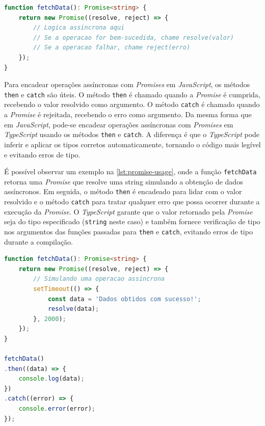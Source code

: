 \begin{lstlisting}[language=TypeScript, caption={Criação de uma \textit{Promise} em \textit{TypeScript}}, label=lst:promise-ts]
function fetchData(): Promise<string> {
    return new Promise((resolve, reject) => {
        // Logica assincrona aqui
        // Se a operacao for bem-sucedida, chame resolve(valor)
        // Se a operacao falhar, chame reject(erro)
    });
}
\end{lstlisting}


Para encadear operações assíncronas com \textit{Promises} em \textit{JavaScript}, os métodos \texttt{then} e \texttt{catch} são úteis. O método \texttt{then} é chamado quando a \textit{Promise} é cumprida, recebendo o valor resolvido como argumento. O método \texttt{catch} é chamado quando a \textit{Promise} é rejeitada, recebendo o erro como argumento. Da mesma forma que em \textit{JavaScript}, pode-se encadear operações assíncronas com \textit{Promises} em \textit{TypeScript} usando os métodos \texttt{then} e \texttt{catch}. A diferença é que o \textit{TypeScript} pode inferir e aplicar os tipos corretos automaticamente, tornando o código mais legível e evitando erros de tipo.

É possível observar um exemplo na \autoref{lst:promise-usage}, onde a função \texttt{fetchData} retorna uma \textit{Promise} que resolve uma string simulando a obtenção de dados assíncronos. Em seguida, o método \texttt{then} é encadeado para lidar com o valor resolvido e o método \texttt{catch} para tratar qualquer erro que possa ocorrer durante a execução da \textit{Promise}. O \textit{TypeScript} garante que o valor retornado pela \textit{Promise} seja do tipo especificado (\texttt{string} neste caso) e também fornece verificação de tipo nos argumentos das funções passadas para \texttt{then} e \texttt{catch}, evitando erros de tipo durante a compilação.

\Needspace{0.3\textheight}
\begin{lstlisting}[language=TypeScript, caption={Exemplo de uso de \textit{Promises} em \textit{TypeScript}}, label=lst:promise-usage]
function fetchData(): Promise<string> {
    return new Promise((resolve, reject) => {
        // Simulando uma operacao assincrona
        setTimeout(() => {
            const data = 'Dados obtidos com sucesso!';
            resolve(data);
        }, 2000);
    });
}

fetchData()
.then((data) => {
    console.log(data);
})
.catch((error) => {
    console.error(error);
});
\end{lstlisting}

